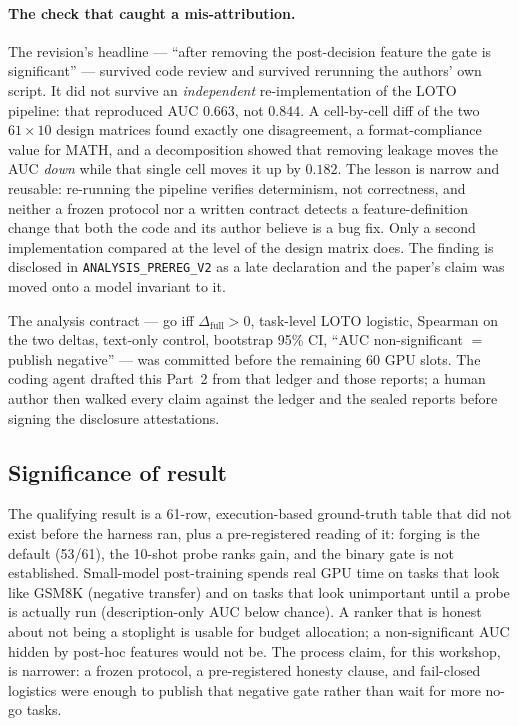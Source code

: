 \paragraph{The check that caught a mis-attribution.}
The revision's headline --- ``after removing the post-decision
feature the gate is significant'' --- survived code review and
survived rerunning the authors' own script. It did not survive an
\emph{independent} re-implementation of the LOTO pipeline: that
reproduced AUC $0.663$, not $0.844$. A cell-by-cell diff of the
two $61{\times}10$ design matrices found exactly one disagreement,
a format-compliance value for MATH, and a decomposition showed
that removing leakage moves the AUC \emph{down} while that single
cell moves it up by $0.182$.
The lesson is narrow and reusable: re-running the pipeline
verifies determinism, not correctness, and neither a frozen
protocol nor a written contract detects a feature-definition
change that both the code and its author believe is a bug fix.
Only a second implementation compared at the level of the design
matrix does. The finding is disclosed in
\texttt{ANALYSIS\_PREREG\_V2} as a late declaration and the paper's
claim was moved onto a model invariant to it.

The analysis contract --- go iff $\Delta_{\mathrm{full}}>0$,
task-level LOTO logistic, Spearman on the two deltas, text-only
control, bootstrap 95\% CI, ``AUC non-significant $=$ publish
negative'' --- was committed before the remaining 60 GPU slots.
The coding agent drafted this Part~2 from that ledger and those
reports; a human author then walked every claim against the
ledger and the sealed reports before signing the disclosure
attestations.

\subsection{Significance of result}
\label{p2:signif}
The qualifying result is a 61-row, execution-based ground-truth
table that did not exist before the harness ran, plus a
pre-registered reading of it: forging is the default (53/61),
the 10-shot probe ranks gain, and the binary gate is not
established.
Small-model post-training spends real GPU time on tasks that
look like GSM8K (negative transfer) and on tasks that look
unimportant until a probe is actually run (description-only AUC
below chance). A ranker that is honest about not being a
stoplight is usable for budget allocation; a non-significant AUC
hidden by post-hoc features would not be.
The process claim, for this workshop, is narrower: a frozen
protocol, a pre-registered honesty clause, and fail-closed
logistics were enough to publish that negative gate rather than
wait for more no-go tasks.

